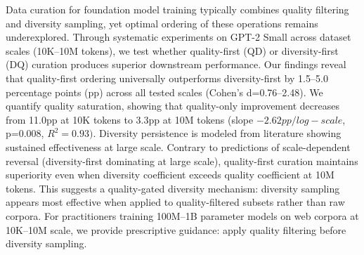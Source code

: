 
Data curation for foundation model training typically combines quality filtering and diversity sampling, yet optimal ordering of these operations remains underexplored. Through systematic experiments on GPT-2 Small across dataset scales (10K--10M tokens), we test whether quality-first (QD) or diversity-first (DQ) curation produces superior downstream performance. Our findings reveal that quality-first ordering universally outperforms diversity-first by 1.5--5.0 percentage points (pp) across all tested scales (Cohen's d=0.76--2.48). We quantify quality saturation, showing that quality-only improvement decreases from 11.0pp at 10K tokens to 3.3pp at 10M tokens (slope $-2.62pp/log-scale$, p=0.008, $R^{2}=0.93)$. Diversity persistence is modeled from literature showing sustained effectiveness at large scale. Contrary to predictions of scale-dependent reversal (diversity-first dominating at large scale), quality-first curation maintains superiority even when diversity coefficient exceeds quality coefficient at 10M tokens. This suggests a quality-gated diversity mechanism: diversity sampling appears most effective when applied to quality-filtered subsets rather than raw corpora. For practitioners training 100M--1B parameter models on web corpora at 10K--10M scale, we provide prescriptive guidance: apply quality filtering before diversity sampling.

